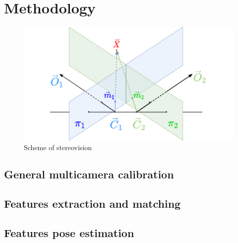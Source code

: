 \chapter{Methodology}

\label{chapter:methodology}


\begin{figure}[h]
    \centering
    \includegraphics[width=.7\textwidth]{graphics/td90deg.png}
    \caption{Scheme of stereovision}
    \label{fig:td90deg}
\end{figure}

\section{General multicamera calibration}

\section{Features extraction and matching}

\section{Features pose estimation}

